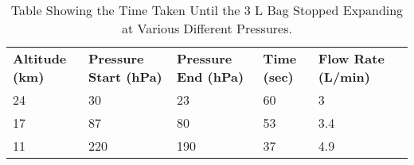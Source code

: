 \begin{table}[H]
\centering

\begin{tabular}{|m{2cm}|m{2cm}|m{2cm}|m{2cm}|m{2cm}|m{2cm}}
\cline{1-5}
\textbf{{\small Altitude (km)}}\par & \textbf{{\small Pressure Start (hPa)}}\par & \textbf{{\small Pressure End (hPa)}}\par & \textbf{{\small Time (sec)}}\par & \textbf{{\small Flow Rate (L/min)}}\par &  \\ \cline{1-5}
24 & 30 & 23 & 60 & 3 &  \\ \cline{1-5}
17 & 87 & 80 & 53 & 3.4 &  \\ \cline{1-5}
11 & 220 & 190 & 37 & 4.9 &  \\ \cline{1-5}
\end{tabular}
\caption{Table Showing the Time Taken Until the 3 L Bag Stopped Expanding at Various Different Pressures.}
\label{tab:pump-low-pressure-result}
\end{table}

\raggedbottom